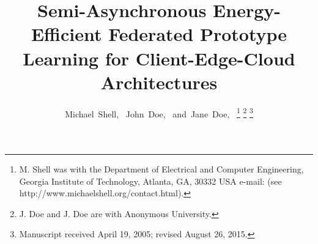 \documentclass[journal]{IEEEtran}
\begin{document}
\title{Semi-Asynchronous Energy-Efficient Federated Prototype Learning for Client-Edge-Cloud Architectures}

\author{Michael~Shell,~
        John~Doe,~
        and~Jane~Doe,~%
\thanks{M. Shell was with the Department
of Electrical and Computer Engineering, Georgia Institute of Technology, Atlanta,
GA, 30332 USA e-mail: (see http://www.michaelshell.org/contact.html).}%
\thanks{J. Doe and J. Doe are with Anonymous University.}%
\thanks{Manuscript received April 19, 2005; revised August 26, 2015.}}



\maketitle
\end{document}
